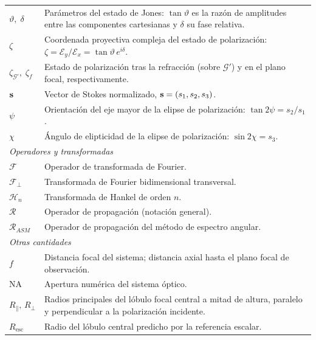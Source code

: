 \begin{longtable}{p{} p{}}
$\vartheta,\;\delta$ & Parámetros del estado de Jones: $\tan\vartheta$ es la razón de amplitudes entre las componentes cartesianas y $\delta$ su fase relativa. \\
$\zeta$ & Coordenada proyectiva compleja del estado de polarización: $\zeta=\mathscr E_y/\mathscr E_x=\tan\vartheta\,e^{i\delta}$. \\
$\zeta_{\mathscr G'},\;\zeta_f$ & Estado de polarización tras la refracción (sobre $\mathscr G'$) y en el plano focal, respectivamente. \\
$\vb s$ & Vector de Stokes normalizado, $\vb s=(s_1,s_2,s_3)$. \\
$\psi$ & Orientación del eje mayor de la elipse de polarización: $\tan 2\psi=s_2/s_1$. \\
$\chi$ & Ángulo de elipticidad de la elipse de polarización: $\sin 2\chi=s_3$. \\
\hline
\multicolumn{2}{l}{\textit{Operadores y transformadas}} \\
\hline
$\mathscr F$ & Operador de transformada de Fourier. \\
$\mathscr F_\perp$ & Transformada de Fourier bidimensional transversal. \\
$\mathscr H_n$ & Transformada de Hankel de orden $n$. \\
$\mathscr R$ & Operador de propagación (notación general). \\
$\mathscr R_{ASM}$ & Operador de propagación del método de espectro angular. \\
\hline
\multicolumn{2}{l}{\textit{Otras cantidades}} \\
\hline
$f$ & Distancia focal del sistema; distancia axial hasta el plano focal de observación. \\
$\mathrm{NA}$ & Apertura numérica del sistema óptico. \\
$R_\parallel,\,R_\perp$ & Radios principales del lóbulo focal central a mitad de altura, paralelo y perpendicular a la polarización incidente. \\
$R_{\mathrm{esc}}$ & Radio del lóbulo central predicho por la referencia escalar. \\
\end{longtable}

